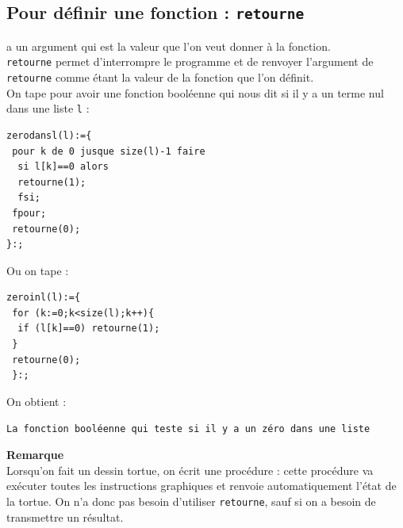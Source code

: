 \documentclass[a4paper,11pt]{book}
\begin{document}
\subsection{Pour d\'efinir une fonction : {\tt retourne}}
 a un argument qui est la valeur que l'on veut donner 
\`a la fonction.\\
{\tt retourne} permet d'interrompre le programme et de renvoyer l'argument 
de {\tt retourne} comme \'etant la valeur de la fonction que l'on d\'efinit.\\
On tape pour avoir une fonction bool\'eenne qui nous dit si il y a un terme nul dans une liste {\tt l} :
\begin{verbatim}
zerodansl(l):={
 pour k de 0 jusque size(l)-1 faire 
  si l[k]==0 alors 
  retourne(1);
  fsi; 
 fpour; 
 retourne(0);
}:;
\end{verbatim}
Ou on tape :\\
\begin{verbatim}
zeroinl(l):={
 for (k:=0;k<size(l);k++){
  if (l[k]==0) retourne(1);
 } 
 retourne(0);
 }:;
\end{verbatim}
On obtient :
\begin{center}{\tt La fonction bool\'eenne qui teste si il y a un z\'ero dans 
une liste}\end{center}
{\bf Remarque}\\
Lorsqu'on fait un dessin tortue, on \'ecrit une proc\'edure : cette proc\'edure
va ex\'ecuter toutes les instructions graphiques et renvoie automatiquement 
l'\'etat de la tortue. On n'a donc pas besoin d'utiliser {\tt retourne}, sauf 
si on a besoin de transmettre un r\'esultat.
\end{document}
